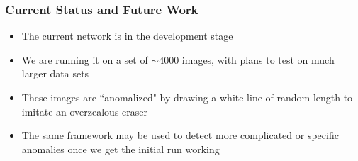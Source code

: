 \documentclass{beamer}
\begin{document}
\begin{frame}

    \frametitle{Current Status and Future Work}
     \begin{itemize}
    \item The current network is in the development stage
    \item We are running it on a set of $\sim$4000 images, with plans to test on much larger data sets
    \item These images are ``anomalized" by drawing a white line of random length to imitate an overzealous eraser
    \item The same framework may be used to detect more complicated or specific anomalies once we get the initial run working
    \end{itemize}
    
\end{frame}






\end{document}
